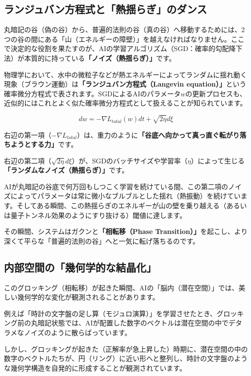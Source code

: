 \subsection{ランジュバン方程式と「熱揺らぎ」のダンス}

丸暗記の谷（偽の谷）から、普遍的法則の谷（真の谷）へ移動するためには、2つの谷の間にある「山（エネルギーの障壁）」を越えなければなりません。ここで決定的な役割を果たすのが、AIの学習アルゴリズム（SGD：確率的勾配降下法）が本質的に持っている\textbf{「ノイズ（熱揺らぎ）」}です。

物理学において、水中の微粒子などが熱エネルギーによってランダムに揺れ動く現象（ブラウン運動）は\textbf{「ランジュバン方程式（Langevin equation）」}という確率微分方程式で表されます。SGDによるAIのパラメータ\(w\)の更新プロセスも、近似的にはこれとよく似た確率微分方程式として扱えることが知られています。

\[dw = -\nabla L_{total}(w) dt + \sqrt{2\eta} d\xi\]

右辺の第一項（\(-\nabla L_{total}\)）は、重力のように\textbf{「谷底へ向かって真っ直ぐ転がり落ちようとする力」}です。

右辺の第二項（\(\sqrt{2\eta} d\xi\)）が、SGDのバッチサイズや学習率（\(\eta\)）によって生じる\textbf{「ランダムなノイズ（熱揺らぎ）」}です。

AIが丸暗記の谷底で何万回もしつこく学習を続けている間、この第二項のノイズによってパラメータは常に微小なブルブルとした揺れ（熱振動）を続けています。そしてある瞬間、この熱揺らぎのエネルギーが山の壁を乗り越える（あるいは量子トンネル効果のようにすり抜ける）閾値に達します。

その瞬間、システムはガクンと\textbf{「相転移（Phase Transition）」}を起こし、より深くて平らな「普遍的法則の谷」へと一気に転げ落ちるのです。

\subsection{内部空間の「幾何学的な結晶化」}

このグロッキング（相転移）が起きた瞬間、AIの「脳内（潜在空間）」では、美しい幾何学的な変化が観測されることがあります。

例えば「時計の文字盤の足し算（モジュロ演算）」を学習させたとき、グロッキング前の丸暗記状態では、AIが配置した数字のベクトルは潜在空間の中でデタラメなノイズのように散らばっています。

しかし、グロッキングが起きた（正解率が急上昇した）時期に、潜在空間の中の数字のベクトルたちが、円（リング）に近い形へと整列し、時計の文字盤のような幾何学構造を自発的に形成することが観測されています。

